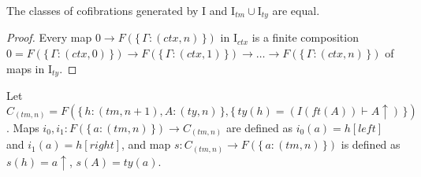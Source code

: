\documentclass[reqno]{amsart}
\theoremstyle{definition}
\theoremstyle{remark}
\newcommand{\I}{\mathrm{I}}
\newcommand{\cyli}{i}
\numberwithin{figure}{section}
\begin{document}
\begin{comment}
We will define several sets of maps that can be used as generating cofibrations.
Some of these sets work in a more general theories,
but if we assume that the theory we are working with has some additional constructions,
then we can use smaller sets of generating cofibrations.
These sets define several model structures, but in most cases the classes of weak equivalences are equal.

Let $i^0_{(ctx,n)}$ be the unique map $0 \to F(\{\,\Gamma : (ctx,n)\,\})$.
Let $\I^k_p$ be the set of maps of the form $i^k_{(p,n)}$.
Let $\I^k_p = \{\,i^k_{(p,n)}\ |\ n \in \mathbb{N}\,\}$ and $\I_{(p,n)} = \{\,i^k_{(p,n)}\ |\ k \in \mathbb{N}\,\}$.

Now, we need to define more generating cofibrations.
There are at least two natural ways in which we can try to define them: using either globular or cubical shapes.
First, let us describe the cubical generating cofibrations.
Define objects $V^{\square^k}_{(p,n)}$ as follows:
\begin{align*}
V^{\square^k}_{(tm,n)} & = F(\{\,a : (tm,n+k)\,\}, \{\,ctx(a) = (ctx^k(a), I^k \vdash)\,\}) \\
V^{\square^k}_{(ty,n)} & = F(\{\,A : (ty,n+k)\,\}, \{\,ctx(A) = (ctx^k(A), I^k \vdash)\,\}) \\
V^{\square^k}_{(ctx,n)} & = F(\{\,\Gamma : (ctx,n+k)\,\}, \{\,ctx^n(\Gamma) = (I^k \vdash)\,\})
\end{align*}
where $\Gamma, I^k \vdash$ is defined as $\Gamma, I, \ldots I$, where $I$ is repeated $k$ times.
\end{comment}

\begin{prop}
The classes of cofibrations generated by $\I$ and $\I_{tm} \cup \I_{ty}$ are equal.
\end{prop}
\begin{proof}
Every map $0 \to F(\{\,\Gamma : (ctx,n)\,\})$ in $\I_{ctx}$ is a finite composition $0 = F(\{\,\Gamma : (ctx,0)\,\}) \to F(\{\,\Gamma : (ctx,1)\,\}) \to \ldots \to F(\{\,\Gamma : (ctx,n)\,\})$ of maps in $\I_{ty}$.
\end{proof}

Let $C_{(tm,n)} = F(\{\,h : (tm,n+1), A : (ty,n)\,\}, \{\,ty(h) = (I(ft(A)) \vdash A\!\!\uparrow)\,\})$.
Maps $\cyli_0, \cyli_1 : F(\{\,a : (tm,n)\,\}) \to C_{(tm,n)}$ are defined as $\cyli_0(a) = h[left]$ and $\cyli_1(a) = h[right]$,
and map $s : C_{(tm,n)} \to F(\{\,a : (tm,n)\,\})$ is defined as $s(h) = a\!\!\uparrow$, $s(A) = ty(a)$.
\end{document}
